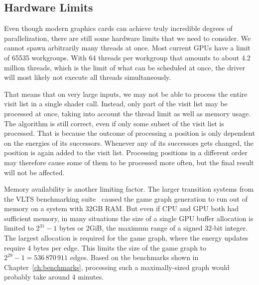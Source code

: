 \subsection{Hardware Limits}\label{subsec:hw_limits}

Even though modern graphics cards can achieve truly incredible degrees of
parallelization,
there are still some hardware limits that we need to consider.
We cannot spawn arbitrarily many threads at once.
Most current GPUs have a limit of 65535 workgroups.
With 64 threads per workgroup that amounts to about 4.2 million threads,
which is the limit of what can be scheduled at once, the driver will most
likely not execute all threads simultaneously.

That means that on very large inputs,
we may not be able to process the entire visit list in a single shader call.
Instead, only part of the visit list may be processed at once,
taking into account the thread limit as well as memory usage.
The algorithm is still correct,
even if only some subset of the visit list is processed.
That is because the outcome of processing a position is only dependent
on the energies of its successors.
Whenever any of its successors gets changed,
the position is again added to the visit list.
Processing positions in a different order may therefore cause some of them
to be processed more often,
but the final result will not be affected.

Memory availability is another limiting factor.
The larger transition systems from the VLTS benchmarking suite~\cite{vlts}
caused the game graph generation to run out of memory
on a system with 32GB RAM\@.
But even if CPU and GPU both had sufficient memory,
in many situations the size of a single GPU buffer allocation
is limited to $2^{31} - 1$ bytes or 2GiB,
the maximum range of a signed 32-bit integer.
The largest allocation is required for the game graph,
where the energy updates require 4 bytes per edge.
This limits the size of the game graph to
$2^{29} - 1 = 536\,870\,911$ edges.
Based on the benchmarks shown in Chapter~\ref{ch:benchmarks},
processing such a maximally-sized graph would probably take around 4 minutes.
